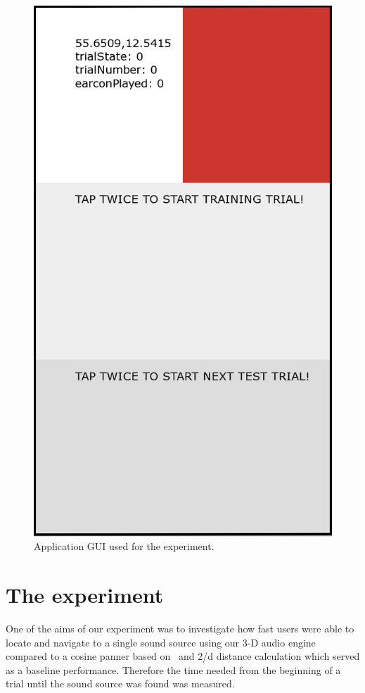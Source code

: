 \documentclass[journal]{IEEEtran}
\begin{document}
\begin{figure}[h!]
 \centering   
   \includegraphics[scale=0.2]{graphics/GUI.png}    
 \caption{Application GUI used for the experiment.}   
  \label{fig:gui}   
\end{figure}

\section{The experiment}
One of the aims of our experiment was to investigate how fast users were able to locate and navigate to a single sound source using our 3-D audio engine compared to a cosine panner based on~\cite{AndyFarnell2010} and 2/d distance calculation which served as a baseline performance. Therefore the time needed from the beginning of a trial until the sound source was found was measured. 
\end{document}
